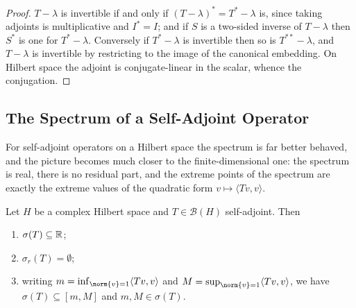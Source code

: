 \documentclass[a4paper]{scrartcl}
\newcommand{\ip}[2]{\langle #1, #2 \rangle}
\newcommand{\Bop}{\mathcal{B}}
\begin{document}
\begin{proof}
	$T - \lambda$ is invertible if and only if $(T-\lambda)^* = T^*-\lambda$ is, since taking adjoints is multiplicative and $I^*=I$; and if $S$ is a two-sided inverse of $T-\lambda$ then $S^*$ is one for $T^*-\lambda$. Conversely if $T^*-\lambda$ is invertible then so is $T^{**}-\lambda$, and $T-\lambda$ is invertible by restricting to the image of the canonical embedding. On Hilbert space the adjoint is conjugate-linear in the scalar, whence the conjugation.
\end{proof}

\subsection{The Spectrum of a Self-Adjoint Operator}

For self-adjoint operators on a Hilbert space the spectrum is far better behaved, and the picture becomes much closer to the finite-dimensional one: the spectrum is real, there is no residual part, and the extreme points of the spectrum are exactly the extreme values of the quadratic form $v \mapsto \ip{Tv}{v}$.

\begin{proposition}
	Let $H$ be a complex Hilbert space and $T\in\Bop(H)$ self-adjoint. Then
	\begin{enumerate}[label=(\roman*)]
		\item $\sigma(T)\subseteq\mathbb{R}$;
		\item $\sigma_r(T)=\emptyset$;
		\item writing $m = \inf_{\norm{v}=1}\ip{Tv}{v}$ and $M = \sup_{\norm{v}=1}\ip{Tv}{v}$, we have $\sigma(T)\subseteq[m,M]$ and $m, M\in\sigma(T)$.
	\end{enumerate}
\end{proposition}
\end{document}
